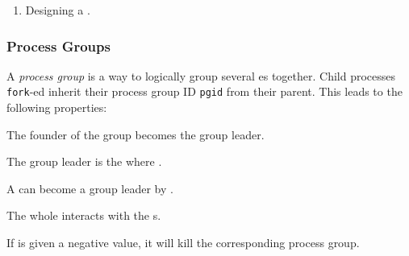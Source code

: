 \begin{enumerate}[noitemsep]
\item Designing a .
\end{enumerate}

\subsubsection{Process Groups}\label{subsubsec:Process_Groups}
\begin{definition}\label{def:Process_Group}
  A \emph{process group} is a way to logically group several es together.
  Child processes \texttt{fork}-ed inherit their process group ID \texttt{pgid} from their parent.
  This leads to the following properties:
  \begin{propertylist}
  \item The founder of the group becomes the group leader.
  \item The group leader is the  where .
  \item A  can become a group leader by .
  \item The whole  interacts with the s.
  \item If  is given a negative value, it will kill the corresponding process group.
  \end{propertylist}
\end{definition}


